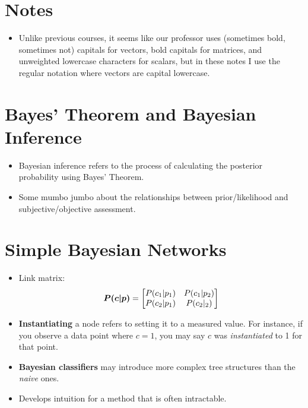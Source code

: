 \documentclass[12pt,twoside]{article}
\begin{document}
\section{Notes}
\begin{itemize}
    \item Unlike previous courses, it seems like our professor uses (sometimes bold, sometimes not) capitals for vectors, bold capitals for matrices, and unweighted lowercase characters for scalars, but in these notes I use the regular notation where vectors are capital lowercase.
\end{itemize}
\section{Bayes' Theorem and Bayesian Inference}

\begin{itemize}
    \item Bayesian inference refers to the process of calculating the posterior probability using Bayes' Theorem.
    \item Some mumbo jumbo about the relationships between prior/likelihood and subjective/objective assessment.
\end{itemize}

\section{Simple Bayesian Networks}

\begin{itemize}
    \item Link matrix:
        \begin{align}
            {\boldsymbol{{P(c|p)}}} = \begin{bmatrix} P(c_1|p_1) & P(c_1|p_2) \\ P(c_2|p_1) & P(c_2|_2) \end{bmatrix}
        \end{align}
    \item \textbf{Instantiating} a node refers to setting it to a measured value. For instance, if you observe a data point where \(c=1\), you may say \(c\) was \textit{instantiated} to 1 for that point.
    \item \textbf{Bayesian classifiers} may introduce more complex tree structures than the \textit{naive} ones.
    \item Develops intuition for a method that is often intractable.
\end{itemize}
\end{document}
